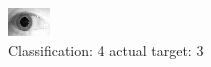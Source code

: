 \begin{figure}[h!]
\begin{center}
\includegraphics[width=0.60\columnwidth]{figures/ID1889_class_4_target_3.png}
\end{center}
\caption{ Classification: 4 actual target: 3}
\label{fig:ID1889_class_4_target_3}
\end{figure}
